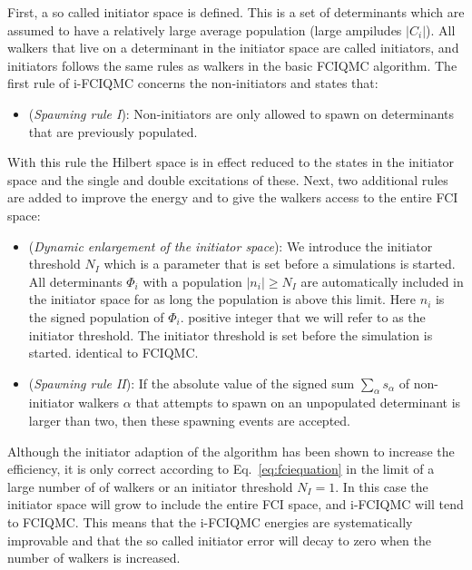 \documentclass[aps,twocolumn,showpacs,floatfix,nofootinbib,preprintnumbers,superscriptaddress,amsmath,amssymb]{revtex4-1}
\begin{document}
First, a so called initiator space is defined. This is a set of
determinants which are assumed to have a relatively large average
population (large ampiludes $|C_i|$). All walkers that live on a
determinant in the initiator space are called initiators, and
initiators follows the same rules as walkers in the basic FCIQMC
algorithm.  The first rule of i-FCIQMC concerns the non-initiators and
states that:
\begin{itemize}
	\item ({\it Spawning rule I}): Non-initiators are only allowed
          to spawn on determinants that are previously populated.
\end{itemize}
With this rule the Hilbert space is in effect reduced to the states in
the initiator space and the single and double excitations of
these. Next, two additional rules are added to improve the energy and
to give the walkers access to the entire FCI space:
\begin{itemize}
			\item ({\it Dynamic enlargement of the
                          initiator space}): We introduce the
                          initiator threshold $N_I$ which is a
                          parameter that is set before a simulations
                          is started.  All determinants $\Phi_i$ with
                          a population $|n_i|\ge N_{I}$ are
                          automatically included in the initiator
                          space for as long the population is above
                          this limit. Here $n_i$ is the signed
                          population of $\Phi_i$. %
                          positive integer that we will refer to as
                          the initiator threshold. The initiator
                          threshold is set before the simulation is
                          started. %
                          identical to FCIQMC.
			\item ({\it Spawning rule II}): If the
                          absolute value of the signed sum
                          $\sum_\alpha s_\alpha$ of non-initiator
                          walkers $\alpha$ that attempts to spawn on
                          an unpopulated determinant is larger than
                          two, then these spawning events are
                          accepted.
\end{itemize}
%
Although the initiator adaption of the algorithm has been shown to
increase the efficiency, it is only correct according to
Eq.~\eqref{eq:fciequation} in the limit of a large number of of
walkers or an initiator threshold $N_I=1$. In this case the initiator
space will grow to include the entire FCI space, and i-FCIQMC will
tend to FCIQMC.
%
This means that the i-FCIQMC energies are systematically improvable
and that the so called initiator error will decay to zero when the
number of walkers is increased.
\end{document}
